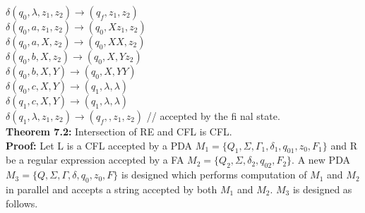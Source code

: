 \documentclass[9pt]{beamer}
\begin{document}
\begin{frame}
\hspace*{2.5cm} $\delta(q_0, \lambda, z_1, z_2) \rightarrow (q_f , z_1, z_2)$ \\
\hspace*{2.5cm} $\delta(q_0, a, z_1, z_2) \rightarrow (q_0, Xz_1, z_2)$ \\
\hspace*{2.5cm} $\delta(q_0, a, X, z_2) \rightarrow (q_0, XX, z_2)$ \\
\hspace*{2.5cm} $\delta(q_0, b, X, z_2) \rightarrow (q_0, X, Yz_2)$ \\
\hspace*{2.5cm} $\delta(q_0, b, X, Y) \rightarrow (q_0, X, YY)$ \\
\hspace*{2.5cm} $\delta(q_0, c, X, Y) \rightarrow (q_1, \lambda, \lambda)$ \\
\hspace*{2.5cm} $\delta(q_1, c, X, Y) \rightarrow (q_1, \lambda, \lambda)$ \\
\hspace*{2.5cm} $\delta(q_1, \lambda, z_1, z_2) \rightarrow (q_f ,, z_1, z_2)$ // accepted by the fi nal state.\\

\vspace*{0.1cm}
\textbf{Theorem 7.2:} Intersection of RE and CFL is CFL.\\

\vspace*{0.1cm}
\textbf{Proof:} Let L is a CFL accepted by a PDA $M_1 = \{Q_1, \Sigma, \Gamma_1, \delta_1, q_01, z_0, F_1\}$ and R be a regular expression
accepted by a FA $M_2 = \{Q_2, \Sigma, \delta_2, q_02, F_2\}$. A new PDA $M_3 = \{Q, \Sigma, \Gamma, \delta, q_0, z_0, F\}$ is designed
which performs computation of $M_1$ and $M_2$ in parallel and accepts a string accepted by both $M_1$ and $M_2$.
$M_3$ is designed as follows.\\

\end{frame}
\end{document}
